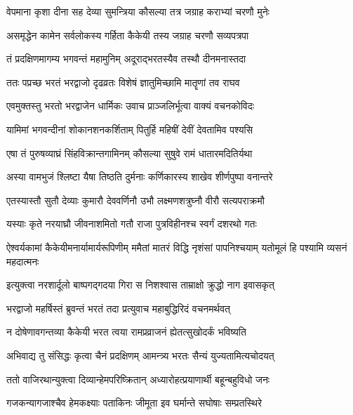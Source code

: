 \twolineshloka
{वेपमाना कृशा दीना सह देव्या सुमन्त्रिया}
{कौसल्या तत्र जग्राह कराभ्यां चरणौ मुनेः} %

\twolineshloka
{असमृद्धेन कामेन सर्वलोकस्य गर्हिता}
{कैकेयी तस्य जग्राह चरणौ सव्यपत्रपा} %

\twolineshloka
{तं प्रदक्षिणमागम्य भगवन्तं महामुनिम्}
{अदूराद्भरतस्यैव तस्थौ दीनमनास्तदा} %

\twolineshloka
{ततः पप्रच्छ भरतं भरद्वाजो दृढव्रतः}
{विशेषं ज्ञातुमिच्छामि मातॄणां तव राघव} %

\twolineshloka
{एवमुक्तस्तु भरतो भरद्वाजेन धार्मिकः}
{उवाच प्राञ्जलिर्भूत्वा वाक्यं वचनकोविदः} %

\twolineshloka
{यामिमां भगवन्दीनां शोकानशनकर्शिताम्}
{पितुर्हि महिषीं देवीं देवतामिव पश्यसि} %

\twolineshloka
{एषा तं पुरुषव्याघ्रं सिंहविक्रान्तगामिनम्}
{कौसल्या सुषुवे रामं धातारमदितिर्यथा} %

\twolineshloka
{अस्या वामभुजं श्लिष्टा यैषा तिष्ठति दुर्मनाः}
{कर्णिकारस्य शाखेव शीर्णपुष्पा वनान्तरे} %

\twolineshloka
{एतस्यास्तौ सुतौ देव्याः कुमारौ देववर्णिनौ}
{उभौ लक्ष्मणशत्रुघ्नौ वीरौ सत्यपराक्रमौ} %

\twolineshloka
{यस्याः कृते नरयाघ्रौ जीवनाशमितो गतौ}
{राजा पुत्रविहीनश्च स्वर्गं दशरथो गतः} %

\threelineshloka
{ऐश्वर्यकामां कैकेयीमनार्यामार्यरूपिणीम्}
{ममैतां मातरं विद्धि नृशंसां पापनिश्चयाम्}
{यतोमूलं हि पश्यामि व्यसनं महदात्मनः} %

\twolineshloka
{इत्युक्त्वा नरशार्दूलो बाष्पगद्गदया गिरा}
{स निशश्वास ताम्राक्षो क्रुद्धो नाग इवासकृत्} %

\twolineshloka
{भरद्वाजो महर्षिस्तं ब्रुवन्तं भरतं तदा}
{प्रत्युवाच महाबुद्धिरिदं वचनमर्थवत्} %

\twolineshloka
{न दोषेणावगन्तव्या कैकेयी भरत त्वया}
{रामप्रव्राजनं ह्येतत्सुखोदर्कं भविष्यति} %

\twolineshloka
{अभिवाद्य तु संसिद्धः कृत्वा चैनं प्रदक्षिणम्}
{आमन्त्र्य भरतः सैन्यं युज्यतामित्यचोदयत्} %

\twolineshloka
{ततो वाजिरथान्युक्त्वा दिव्यान्हेमपरिष्क्रितान्}
{अध्यारोहत्प्रयाणार्थी बहून्बहुविधो जनः} %

\twolineshloka
{गजकन्यागजाश्चैव हेमकक्ष्याः पताकिनः}
{जीमूता इव घर्मान्ते सघोषाः सम्प्रतस्थिरे} %

